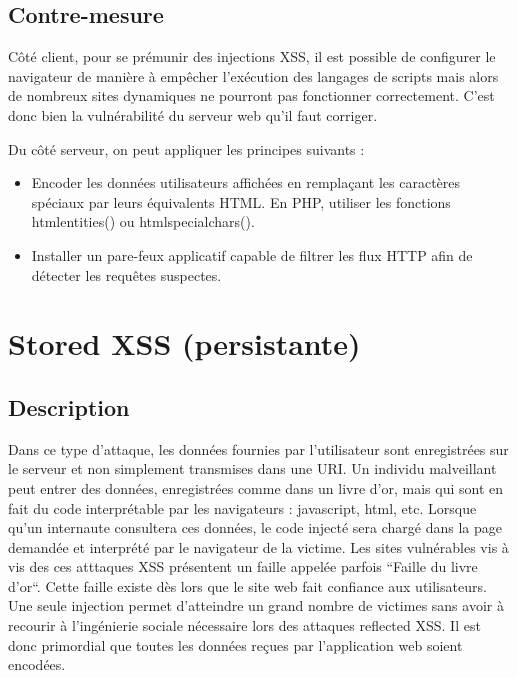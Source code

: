 \subsection{Contre-mesure}

Côté client, pour se prémunir des injections XSS, il est possible de configurer le navigateur de manière à empêcher l'exécution des langages de scripts mais alors de nombreux sites dynamiques ne pourront pas fonctionner correctement. C'est donc bien la vulnérabilité du serveur web qu'il faut corriger.


Du côté serveur, on peut appliquer les principes suivants :
\begin{itemize}[font=\color{magenta} \Large, label=]
	\item Encoder les données utilisateurs affichées en remplaçant les caractères spéciaux par leurs équivalents HTML. En PHP, utiliser les fonctions htmlentities() ou htmlspecialchars().​ 
	\item Installer un pare-feux applicatif capable de filtrer les flux HTTP afin de détecter les requêtes suspectes.

\end{itemize}



\newpage
\section{Stored XSS (persistante)  }


\subsection{Description}

Dans ce type d'attaque, les données fournies par l'utilisateur sont enregistrées sur le serveur et non simplement transmises dans une URI. Un individu malveillant peut entrer des données, enregistrées comme dans un livre d'or, mais qui sont en fait du code interprétable par les navigateurs : javascript, html, etc. Lorsque qu'un internaute consultera ces données, le code injecté sera chargé dans la page demandée et interprété par le navigateur de la victime. Les sites vulnérables vis à vis des ces atttaques XSS présentent un faille appelée parfois “Faille du livre d’or“. Cette faille existe dès lors que le site web fait confiance aux utilisateurs. Une seule injection permet d'atteindre un grand nombre de victimes sans avoir à recourir à l'ingénierie sociale nécessaire lors des attaques reflected XSS. Il est donc primordial que toutes les données reçues par l'application web soient encodées.


